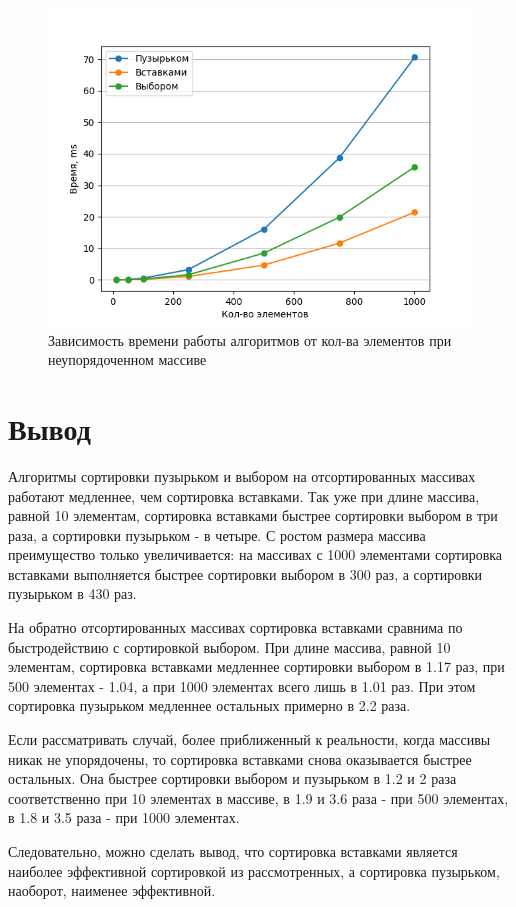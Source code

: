 \begin{figure}[!h]
	\centering
	\includegraphics[scale=0.9]{imgs/random.png}
	\caption{Зависимость времени работы алгоритмов от кол-ва элементов при неупорядоченном массиве}
	\label{img:profiling-rand}
\end{figure}

\section{Вывод}

Алгоритмы сортировки пузырьком и выбором на отсортированных массивах работают медленнее, чем сортировка вставками.
Так уже при длине массива, равной 10 элементам, сортировка вставками быстрее сортировки выбором в три раза,
 а сортировки пузырьком - в четыре. С ростом размера массива преимущество только увеличивается: на массивах 
 с 1000 элементами сортировка вставками выполняется быстрее сортировки выбором в 300 раз,
а сортировки пузырьком в 430 раз.

На обратно отсортированных массивах сортировка вставками сравнима по быстродействию с сортировкой выбором.
При длине массива, равной 10 элементам, сортировка вставками медленнее сортировки выбором в 1.17 раз, при 500
элементах - 1.04, а при 1000 элементах всего лишь в 1.01 раз. При этом сортировка пузырьком медленнее остальных 
примерно в 2.2 раза.

Если рассматривать случай, более приближенный к реальности, когда массивы никак не упорядочены, то сортировка 
вставками снова оказывается быстрее остальных. Она быстрее сортировки выбором и пузырьком в 1.2 и 2 раза
соответственно при 10 элементах в массиве, в 1.9 и 3.6 раза - при 500 элементах, в 1.8 и 3.5 раза - при 1000 элементах.

Следовательно, можно сделать вывод, что сортировка вставками является наиболее эффективной сортировкой из рассмотренных,
а сортировка пузырьком, наоборот, наименее эффективной.